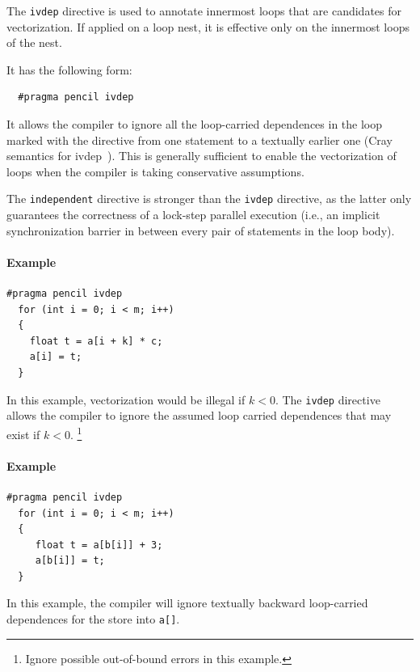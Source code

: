 The \lstinline!ivdep! directive is used to annotate innermost loops that are candidates
  for vectorization.  If applied on a loop nest, it is effective only on
  the innermost loops of the nest.

  It has the following form:
  \begin{lstlisting}
  #pragma pencil ivdep
  \end{lstlisting}
  
  It allows the
  compiler to ignore all the loop-carried dependences in the loop marked with
  the directive from one statement to a textually earlier one (Cray semantics for ivdep~\cite{cray}).
  This is generally sufficient to enable the vectorization
  of loops when the compiler is taking conservative assumptions.

  The \lstinline!independent!  directive is stronger than the
  \lstinline!ivdep! directive, as the latter only guarantees the
  correctness of a lock-step parallel execution (i.e., an implicit
  synchronization barrier in between every pair of statements in the loop
  body).
  
  \paragraph{Example}

  \begin{lstlisting}[language=pencil]
  #pragma pencil ivdep
  for (int i = 0; i < m; i++)
  {
    float t = a[i + k] * c;
    a[i] = t;
  }
  \end{lstlisting}
  In this example, vectorization would be illegal if $k < 0$.  The
  \lstinline!ivdep! directive allows the compiler to ignore the assumed
  loop carried dependences that may exist if $k < 0$. \footnote{Ignore
  possible out-of-bound errors in this example.}
  
  \paragraph{Example}
  
  \begin{lstlisting}[language=pencil]
  #pragma pencil ivdep
  for (int i = 0; i < m; i++)
  {
     float t = a[b[i]] + 3;
     a[b[i]] = t;
  }
  \end{lstlisting}
  In this example, the compiler will ignore textually backward
  loop-carried dependences for the store into \lstinline!a[]!.

%

